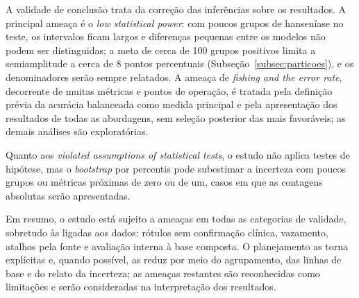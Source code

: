A validade de conclusão trata da correção das inferências sobre os
resultados. A principal ameaça é o \textit{low statistical power}: com poucos
grupos de hanseníase no teste, os intervalos ficam largos e diferenças
pequenas entre os modelos não podem ser distinguidas; a meta de cerca de 100
grupos positivos limita a semiamplitude a cerca de 8 pontos percentuais
(Subseção~\ref{subsec:particoes}), e os denominadores serão sempre
relatados. A ameaça de \textit{fishing and the error rate}, decorrente de
muitas métricas e pontos de operação, é tratada pela definição
prévia da acurácia balanceada como medida principal e pela apresentação
dos resultados de todas as abordagens, sem seleção posterior das mais
favoráveis; as demais análises são exploratórias.

Quanto aos \textit{violated assumptions of statistical tests}, o estudo não
aplica testes de hipótese, mas o \textit{bootstrap} por percentis pode
subestimar a incerteza com poucos grupos ou métricas próximas de zero ou de
um, casos em que as contagens absolutas serão apresentadas.

Em resumo, o estudo está sujeito a ameaças em todas as categorias de
validade, sobretudo às ligadas aos dados: rótulos sem confirmação clínica,
vazamento, atalhos pela fonte e avaliação interna à base composta. O planejamento as torna
explícitas e, quando possível, as reduz por meio do agrupamento, das linhas
de base e do relato da incerteza; as ameaças restantes são reconhecidas como
limitações e serão consideradas na interpretação dos resultados.

\clearpage
\endgroup
